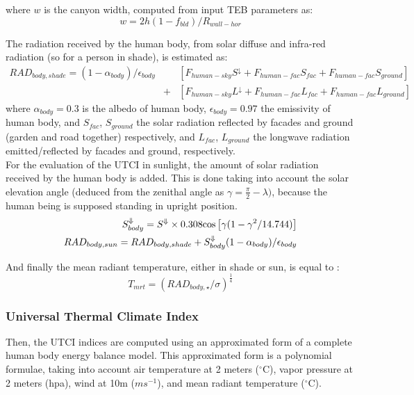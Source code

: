 where $w$ is the canyon width, computed from input TEB parameters as:
\begin{displaymath}
w = 2h (1-f_{bld}) / R_{wall-hor}
\end{displaymath}

The radiation received by the human body, from solar diffuse and infra-red radiation (so for a person in shade), is estimated as:
\begin{eqnarray}
	RAD_{body,shade} = (1-\alpha_{body})/\epsilon_{body} &&\left[  F_{human-sky}S^\downarrow + F_{human-fac} S_{fac} + F_{human-fac} S_{ground} \right] \nonumber \\
		    &	+ &\left[  F_{human-sky}L^\downarrow + F_{human-fac} L_{fac} + F_{human-fac} L_{ground} \right]
\end{eqnarray}
where $\alpha_{body}=0.3$ is the albedo of human body, $\epsilon_{body}=0.97$ the emissivity of human body, and $S_{fac}$, $S_{ground}$ the solar radiation reflected by facades and ground (garden and road together) respectively, and $L_{fac}$, $L_{ground}$ the longwave radiation emitted/reflected by facades and ground, respectively. \\

For the evaluation of the UTCI in sunlight, the amount of solar radiation received by the human body is added. This is done taking into account the solar elevation angle (deduced from the zenithal angle as $\gamma = \frac{\pi}{2}-\lambda)$, because the human being is supposed standing in upright position.
\begin{eqnarray}
S^\Downarrow_{body} = S^\Downarrow \times 0.308 {\rm cos}\left[ \gamma (1-\gamma^2/14.744) \right] \nonumber \\
RAD_{body,sun} = RAD_{body,shade} + S^\Downarrow_{body}(1-\alpha_{body})/\epsilon_{body} \nonumber
\end{eqnarray}

And finally the mean radiant temperature, either in shade or sun, is equal to :
\begin{equation}
	T_{mrt} = (RAD_{body,\star} / \sigma)^{\frac{1}{4}}
\end{equation}


\subsubsection{Universal Thermal Climate Index}

Then, the UTCI indices are computed using an approximated form of a complete human body energy balance model. This approximated form is a polynomial formulae, taking into account air temperature at 2 meters ($^\circ$C), vapor pressure at 2 meters (hpa), wind at 10m ($ms^{-1}$), and mean radiant temperature ($^\circ$C). \\

